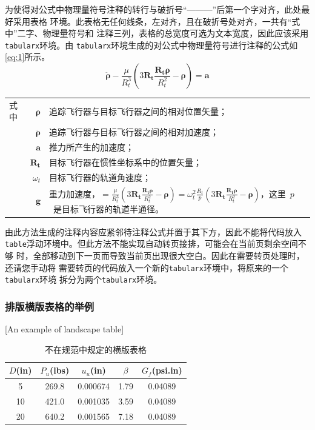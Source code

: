 为使得对公式中物理量符号注释的转行与破折号“———”后第一个字对齐，此处最好采用表格
环境。此表格无任何线条，左对齐，且在破折号处对齐，一共有“式中”二字、物理量符号和
注释三列，表格的总宽度可选为文本宽度，因此应该采用\verb|tabularx|环境。由
\verb|tabularx|环境生成的对公式中物理量符号进行注释的公式如\cref{eq:1}所示。
\begin{equation}
  \label{eq:1} \ddot{\boldsymbol{\rho}}-\frac{\mu}{R_{t}^{3}}\left(3\mathbf{R_{t}}\frac{\mathbf{R_{t}\rho}}{R_{t}^{2}}-\boldsymbol{\rho}\right)=\mathbf{a}
\end{equation}
\begin{tabularx}{\textwidth}{@{}l@{\quad}r@{———}X@{}}
式中& $\boldsymbol{\rho}$ &追踪飞行器与目标飞行器之间的相对位置矢量；\\
&  $\boldsymbol{\ddot{\rho}}$&追踪飞行器与目标飞行器之间的相对加速度；\\
&  $\mathbf{a}$   &推力所产生的加速度；\\
&  $\mathbf{R_t}$ & 目标飞行器在惯性坐标系中的位置矢量；\\
&  $\omega_{t}$ & 目标飞行器的轨道角速度；\\
&  $\mathbf{g}$ & 重力加速度，$=\frac{\mu}{R_{t}^{3}}\left(
3\mathbf{R_{t}}\frac{\mathbf{R_{t}\rho}}{R_{t}^{2}}-\boldsymbol{\rho}\right)=\omega_{t}^{2}\frac{R_{t}}{p}\left(
3\mathbf{R_{t}}\frac{\mathbf{R_{t}\rho}}{R_{t}^{2}}-\boldsymbol{\rho}\right)$，这里~$p$~是目标飞行器的轨道半通径。
\end{tabularx}\vspace{3.15bp}
由此方法生成的注释内容应紧邻待注释公式并置于其下方，因此不能将代码放入
\verb|table|浮动环境中。但此方法不能实现自动转页接排，可能会在当前页剩余空间不够
时，全部移动到下一页而导致当前页出现很大空白。因此在需要转页处理时，还请您手动将
需要转页的代码放入一个新的\verb|tabularx|环境中，将原来的一个\verb|tabularx|环境
拆分为两个\verb|tabularx|环境。

\subsubsection{排版横版表格的举例}[An example of landscape table]

\begin{table}[p]
\centering
\begin{sideways}
\begin{minipage}{\textheight}
\caption{不在规范中规定的横版表格}
\label{table4}
\vspace{0.5em}\centering\wuhao
\begin{tabular}{ccccc}
\toprule
$D$(in) & $P_u$(lbs) & $u_u$(in) & $\beta$ & $G_f$(psi.in)\\
\midrule
 5 & 269.8 & 0.000674 & 1.79 & 0.04089\\
10 & 421.0 & 0.001035 & 3.59 & 0.04089\\
20 & 640.2 & 0.001565 & 7.18 & 0.04089\\
\bottomrule
\end{tabular}
\end{minipage}
\end{sideways}
\end{table}



